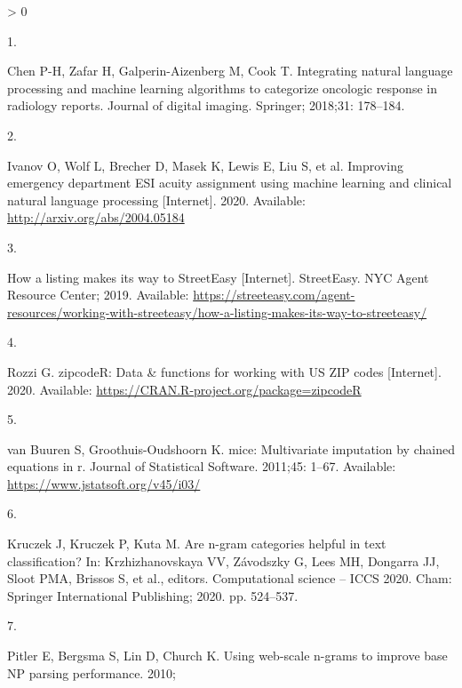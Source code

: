 \documentclass[10pt,letterpaper]{article}
\newlength{\csllabelwidth}
\newlength{\cslhangindent}
\newenvironment{CSLReferences}[3] %
 {%
  \setlength{\parindent}{0pt}
  \ifodd #1 \everypar{\setlength{\hangindent}{\cslhangindent}}\ignorespaces\fi
  \ifnum #2 > 0
  \setlength{\parskip}{#2\baselineskip}
  \fi
 }%
 {}
\newcommand{\CSLLeftMargin}[1]{\parbox[t]{\csllabelwidth}{#1}}
\newcommand{\CSLRightInline}[1]{\parbox[t]{\linewidth - \csllabelwidth}{#1}}
\begin{document}
\hypertarget{refs}{}
\begin{CSLReferences}{0}{0}
\leavevmode\hypertarget{ref-chen2018integrating}{}%
\CSLLeftMargin{1. }
\CSLRightInline{Chen P-H, Zafar H, Galperin-Aizenberg M, Cook T.
Integrating natural language processing and machine learning algorithms
to categorize oncologic response in radiology reports. Journal of
digital imaging. Springer; 2018;31: 178--184. }

\leavevmode\hypertarget{ref-ivanov2020improving}{}%
\CSLLeftMargin{2. }
\CSLRightInline{Ivanov O, Wolf L, Brecher D, Masek K, Lewis E, Liu S, et
al. Improving emergency department ESI acuity assignment using machine
learning and clinical natural language processing {[}Internet{]}. 2020.
Available: \url{http://arxiv.org/abs/2004.05184}}

\leavevmode\hypertarget{ref-streeteasy_2019}{}%
\CSLLeftMargin{3. }
\CSLRightInline{How a listing makes its way to StreetEasy
{[}Internet{]}. StreetEasy. NYC Agent Resource Center; 2019. Available:
\url{https://streeteasy.com/agent-resources/working-with-streeteasy/how-a-listing-makes-its-way-to-streeteasy/}}

\leavevmode\hypertarget{ref-zipcodeR_2020}{}%
\CSLLeftMargin{4. }
\CSLRightInline{Rozzi G. zipcodeR: Data \& functions for working with US
ZIP codes {[}Internet{]}. 2020. Available:
\url{https://CRAN.R-project.org/package=zipcodeR}}

\leavevmode\hypertarget{ref-mice_2011}{}%
\CSLLeftMargin{5. }
\CSLRightInline{van Buuren S, Groothuis-Oudshoorn K. {mice}:
Multivariate imputation by chained equations in r. Journal of
Statistical Software. 2011;45: 1--67. Available:
\url{https://www.jstatsoft.org/v45/i03/}}

\leavevmode\hypertarget{ref-kruczekngrams}{}%
\CSLLeftMargin{6. }
\CSLRightInline{Kruczek J, Kruczek P, Kuta M. Are n-gram categories
helpful in text classification? In: Krzhizhanovskaya VV, Závodszky G,
Lees MH, Dongarra JJ, Sloot PMA, Brissos S, et al., editors.
Computational science -- ICCS 2020. Cham: Springer International
Publishing; 2020. pp. 524--537. }

\leavevmode\hypertarget{ref-pitler2010using}{}%
\CSLLeftMargin{7. }
\CSLRightInline{Pitler E, Bergsma S, Lin D, Church K. Using web-scale
n-grams to improve base NP parsing performance. 2010; }

\end{CSLReferences}

\nolinenumbers
\end{document}
